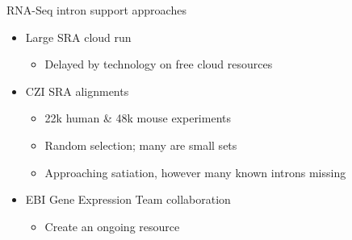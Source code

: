 \documentclass[10pt,
               hyperref={bookmarks=false,
                         bookmarksopen=false,
                         colorlinks=true,
                         linkcolor=blue,
                         urlcolor=blue},
               xcolor={svgnames,table}]{beamer}
\newenvironment{tightitemize}{%
\begin{itemize}
  \setlength{\itemsep}{1pt}%
  \setlength{\parskip}{0pt}%
  \setlength{\parsep}{0pt}%
}{\end{itemize}}
\begin{document}
\begin{frame}{RNA-Seq intron support approaches}
  \begin{itemize}
  \item Large SRA cloud run
    \begin{tightitemize}
    \item Delayed by technology on free cloud resources
    \end{tightitemize}
  \item CZI SRA alignments
    \begin{tightitemize}
    \item 22k human \& 48k mouse experiments
    \item Random selection; many are small sets
    \item Approaching satiation, however many known introns missing
    \end{tightitemize}
  \item EBI Gene Expression Team collaboration
    \begin{tightitemize}
    \item Create an ongoing resource
    \end{tightitemize}
  \end{itemize}
\end{frame}
\end{document}
